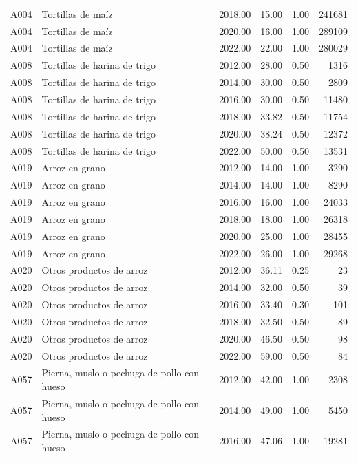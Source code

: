 \begin{table}[ht]
\begin{tabular}{llrrrr}
  A004 & Tortillas de maíz & 2018.00 & 15.00 & 1.00 & 241681 \\ 
  A004 & Tortillas de maíz & 2020.00 & 16.00 & 1.00 & 289109 \\ 
  A004 & Tortillas de maíz & 2022.00 & 22.00 & 1.00 & 280029 \\ 
  A008 & Tortillas de harina de trigo & 2012.00 & 28.00 & 0.50 & 1316 \\ 
  A008 & Tortillas de harina de trigo & 2014.00 & 30.00 & 0.50 & 2809 \\ 
  A008 & Tortillas de harina de trigo & 2016.00 & 30.00 & 0.50 & 11480 \\ 
  A008 & Tortillas de harina de trigo & 2018.00 & 33.82 & 0.50 & 11754 \\ 
  A008 & Tortillas de harina de trigo & 2020.00 & 38.24 & 0.50 & 12372 \\ 
  A008 & Tortillas de harina de trigo & 2022.00 & 50.00 & 0.50 & 13531 \\ 
  A019 & Arroz en grano & 2012.00 & 14.00 & 1.00 & 3290 \\ 
  A019 & Arroz en grano & 2014.00 & 14.00 & 1.00 & 8290 \\ 
  A019 & Arroz en grano & 2016.00 & 16.00 & 1.00 & 24033 \\ 
  A019 & Arroz en grano & 2018.00 & 18.00 & 1.00 & 26318 \\ 
  A019 & Arroz en grano & 2020.00 & 25.00 & 1.00 & 28455 \\ 
  A019 & Arroz en grano & 2022.00 & 26.00 & 1.00 & 29268 \\ 
  A020 & Otros productos de arroz & 2012.00 & 36.11 & 0.25 &  23 \\ 
  A020 & Otros productos de arroz & 2014.00 & 32.00 & 0.50 &  39 \\ 
  A020 & Otros productos de arroz & 2016.00 & 33.40 & 0.30 & 101 \\ 
  A020 & Otros productos de arroz & 2018.00 & 32.50 & 0.50 &  89 \\ 
  A020 & Otros productos de arroz & 2020.00 & 46.50 & 0.50 &  98 \\ 
  A020 & Otros productos de arroz & 2022.00 & 59.00 & 0.50 &  84 \\ 
  A057 & Pierna, muslo o pechuga de pollo con hueso & 2012.00 & 42.00 & 1.00 & 2308 \\ 
  A057 & Pierna, muslo o pechuga de pollo con hueso & 2014.00 & 49.00 & 1.00 & 5450 \\ 
  A057 & Pierna, muslo o pechuga de pollo con hueso & 2016.00 & 47.06 & 1.00 & 19281 \\ 

\end{tabular}
\end{table}
